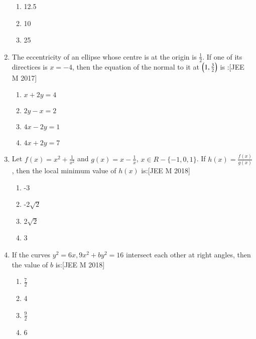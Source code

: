 \documentclass[journal,12pt,twocolumn]{IEEEtran}
\theoremstyle{remark}
\begin{document}
\begin{enumerate}
\begin{enumerate}
    \item  12.5\\
    \item  10\\
    \item  25\\
\end{enumerate}
\item The eccentricity of an ellipse whose centre is at the origin is $\frac{1}{2}$. If one of its directices is $x=-4$, then the equation of the normal to it at $\left(1, \frac{3}{2}\right)$ is :\hfill[JEE M 2017]\\
\begin{enumerate}
    \item  $x+2y=4$\\
    \item  $2y-x=2$\\
    \item  $4x-2y=1$\\
    \item  $4x+2y=7$\\
\end{enumerate}
\item Let $f(x)=x^{2}+\frac{1}{x^2}$ and $g(x)=x-\frac{1}{x}$, $x \in R-{\{-1,0,1}\}$. If $h(x)=\frac{f(x)}{g(x)}$, then the local minimum value of $h(x)$ is:\hfill[JEE M 2018]\\
\begin{enumerate}
    \item  -3\\
    \item  -2$\sqrt{2}$\\
    \item   2$\sqrt{2}$\\
    \item   3\\
\end{enumerate}
\item If the curves $y^2=6x, 9x^2+by^2=16$ intersect each other at right angles, then the value of $b$ is:\hfill[JEE M 2018]\\
\begin{enumerate}
    \item  $\frac{7}{2}$\\
    \item  4\\
    \item  $\frac{9}{2}$\\
    \item  6\\
\end{enumerate}
\end{enumerate}
\end{document}
